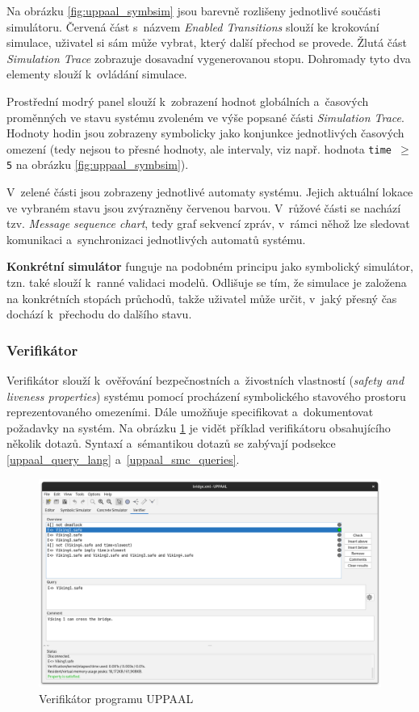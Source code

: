 Na obrázku \ref{fig:uppaal_symbsim} jsou barevně rozlišeny jednotlivé součásti simulátoru. Červená část s~názvem \textit{Enabled Transitions} slouží ke krokování simulace, uživatel si sám může vybrat, který další přechod se provede. Žlutá část \textit{Simulation Trace} zobrazuje dosavadní vygenerovanou stopu. Dohromady tyto dva elementy slouží k~ovládání simulace.

Prostřední modrý panel slouží k~zobrazení hodnot globálních a~časových proměnných ve stavu systému zvoleném ve výše popsané části \textit{Simulation Trace}. Hodnoty hodin jsou zobrazeny symbolicky jako konjunkce jednotlivých časových omezení (tedy nejsou to přesné hodnoty, ale intervaly, viz např. hodnota \texttt{time $\geq$ 5} na obrázku \ref{fig:uppaal_symbsim}).

V~zelené části jsou zobrazeny jednotlivé automaty systému. Jejich aktuální lokace ve vybraném stavu jsou zvýrazněny červenou barvou. V~růžové části se nachází tzv. \textit{Message sequence chart}, tedy graf sekvencí zpráv, v~rámci něhož lze sledovat komunikaci a~synchronizaci jednotlivých automatů systému.

\bigskip

\textbf{Konkrétní simulátor} funguje na podobném principu jako symbolický simulátor, tzn. také slouží k~ranné validaci modelů. Odlišuje se tím, že simulace je založena na konkrétních stopách průchodů, takže uživatel může určit, v~jaký přesný čas dochází k~přechodu do dalšího stavu.

\subsubsection{Verifikátor}
Verifikátor slouží k~ověřování bezpečnostních a~živostních vlastností (\textit{safety and liveness properties}) systému pomocí procházení symbolického stavového prostoru reprezentovaného omezeními. Dále umožňuje specifikovat a~dokumentovat požadavky na systém. Na obrázku \ref{fig:uppaal_verifier} je vidět příklad verifikátoru obsahujícího několik dotazů. Syntaxí a~sémantikou dotazů se zabývají podsekce \ref{uppaal_query_lang} a~\ref{uppaal_smc_queries}.

\begin{figure}[H]
    \centering
    \includegraphics[width=\textwidth]{obrazky-figures/uppaal_verifier.png}
    \caption{Verifikátor programu UPPAAL}
    \label{fig:uppaal_verifier}
\end{figure}

